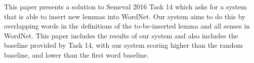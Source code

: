 This paper presents a solution to Semeval 2016 Task 14 which asks for a system that is able to insert new lemmas into WordNet. Our system aims to do this by overlapping words in the definitions of the to-be-inserted lemma and all senses in WordNet. This paper includes the results of our system and also includes the baseline provided by Task 14, with our system scoring higher than the random baseline, and lower than the first word baseline.
